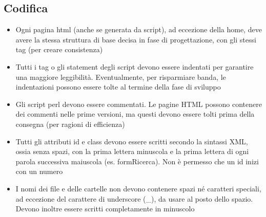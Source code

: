 \subsection{Codifica}
\begin{itemize}
	\item Ogni pagina html (anche se generata da script), ad eccezione della home, deve avere la stessa struttura di base decisa in fase di progettazione, con gli stessi tag (per creare consistenza)
	
	\item Tutti i tag o gli statement degli script devono essere indentati per garantire una maggiore leggibilità. Eventualmente, per risparmiare banda, le indentazioni possono essere tolte al termine della fase di sviluppo
	
	\item Gli script perl devono essere commentati. Le pagine HTML possono contenere dei commenti nelle prime versioni, ma questi devono essere tolti prima della consegna (per ragioni di efficienza)
	
	\item Tutti gli attributi id e class devono essere scritti secondo la sintassi XML, ossia senza spazi, con la prima lettera minuscola e la prima lettera di ogni parola successiva maiuscola (es. formRicerca). Non è permesso che un id inizi con un numero 
	
	\item I nomi dei file e delle cartelle non devono contenere spazi né caratteri speciali, ad eccezione del carattere di underscore (\_), da usare al posto dello spazio. Devono inoltre essere scritti completamente in minuscolo
	
\end{itemize}

\newpage